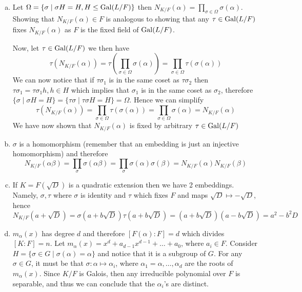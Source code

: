 \begin{solution}
    \begin{enumerate}[(a)]
        \item Let $\Omega = \{\sigma \mid \sigma H = H, H \leq \operatorname{Gal}(L/F)\}$ then $N_{K/F}(\alpha) = \prod_{\sigma \in \Omega} \sigma(\alpha)$. Showing that $N_{K/F}(\alpha) \in F$ is analogous to showing that any $\tau \in \operatorname{Gal}(L/F)$ fixes $N_{K/F}(\alpha)$ as $F$ is the fixed field of $\operatorname{Gal}(L/F)$.
        
        Now, let $\tau \in \operatorname{Gal}(L/F)$ we then have
        \[\tau(N_{K/F}(\alpha)) = \tau(\prod_{\sigma \in \Omega} \sigma(\alpha)) = \prod_{\sigma \in \Omega} \tau(\sigma(\alpha))\]
        We can now notice that if $\tau\sigma_1$ is in the same coset as $\tau\sigma_2$ then $\tau\sigma_1 = \tau\sigma_1h, h \in H$ which implies that $\sigma_1$ is in the same coset as $\sigma_2$, therefore $\{\sigma \mid \sigma H = H\} = \{\tau\sigma \mid \tau\sigma H = H\} = \Omega$. Hence we can simplify
        \[\tau(N_{K/F}(\alpha)) = \prod_{\sigma \in \Omega} \tau(\sigma(\alpha)) =  \prod_{\sigma \in \Omega} \sigma(\alpha) = N_{K/F}(\alpha)\]
        We have now shown that $N_{K/F}(\alpha)$ is fixed by arbitrary $\tau \in \operatorname{Gal}(L/F)$

        \item $\sigma$ is a homomorphism (remember that an embedding is just an injective homomorphism) and therefore 
        \[N_{K/F}(\alpha\beta) = \prod_{\sigma}\sigma(\alpha\beta) = \prod_{\sigma}\sigma(\alpha)\sigma(\beta) = N_{K/F}(\alpha)N_{K/F}(\beta)\]

        \item If $K = F(\sqrt{D})$ is a quadratic extension then we have 2 embeddings. Namely, $\sigma, \tau$ where $\sigma$ is identity and $\tau$ which fixes $F$ and maps $\sqrt{D} \mapsto -\sqrt{D}$, hence
        \[N_{K/F}(a+\sqrt{D}) = \sigma(a + b\sqrt{D})\tau(a + b\sqrt{D}) = (a + b\sqrt{D})(a - b\sqrt{D}) = a^2 - b^2D\]

        \item $m_{\alpha}(x)$ has degree $d$ and therefore $[F(\alpha):F] = d$ which divides $[K:F] = n$. Let $m_{\alpha}(x)=x^{d}+a_{d-1}x^{d-1}+\dots+a_{0}$, where $a_{i}\in F$. Consider $H=\{\sigma\in G\mid\sigma(\alpha)=\alpha\}$ and notice that it is a subgroup of $G$. For any $\sigma\in G$, it must be that $\sigma:\alpha\mapsto\alpha_{i}$, where $\alpha_{1}=\alpha,\dots,\alpha_{d}$ are the roots of $m_{\alpha}(x)$. Since $K/F$ is Galois, then any irreducible polynomial over $F$ is separable, and thus we can conclude that the $\alpha_{i}$'s are distinct.


\end{enumerate}
\end{solution}
